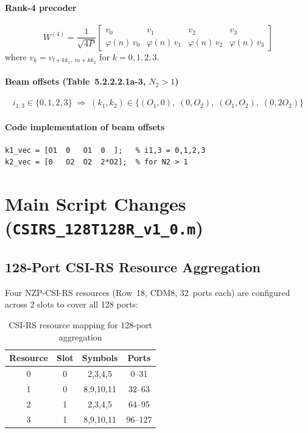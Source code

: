 \documentclass[11pt,a4paper]{article}
\begin{document}
\paragraph{Rank-4 precoder}
\begin{equation}
  W^{(4)} = \frac{1}{\sqrt{4P}}
  \begin{bmatrix}
    v_0 & v_1 & v_2 & v_3 \\
    \varphi(n)\,v_0 & \varphi(n)\,v_1 & \varphi(n)\,v_2 & \varphi(n)\,v_3
  \end{bmatrix}
\end{equation}
where $v_k = v_{l+k k_1,\;m+k k_2}$ for $k=0,1,2,3$.

\paragraph{Beam offsets (Table~5.2.2.2.1a-3, $N_2 > 1$)}
\begin{equation}
  i_{1,3} \in \{0,1,2,3\} \;\Rightarrow\;
  (k_1,k_2) \in \{(O_1,0),\;(0,O_2),\;(O_1,O_2),\;(0,2O_2)\}
\end{equation}

\paragraph{Code implementation of beam offsets}
\begin{lstlisting}
k1_vec = [O1  0   O1  0  ];   % i1,3 = 0,1,2,3
k2_vec = [0   O2  O2  2*O2];  % for N2 > 1
\end{lstlisting}

\section{Main Script Changes (\texttt{CSIRS\_128T128R\_v1\_0.m})}

\subsection{128-Port CSI-RS Resource Aggregation}

Four NZP-CSI-RS resources (Row~18, CDM8, 32~ports each) are configured
across 2 slots to cover all 128 ports:

\begin{table}[h]
\centering
\caption{CSI-RS resource mapping for 128-port aggregation}
\begin{tabular}{cccc}
\toprule
Resource & Slot & Symbols & Ports \\
\midrule
0 & 0 & 2,3,4,5 & 0--31 \\
1 & 0 & 8,9,10,11 & 32--63 \\
2 & 1 & 2,3,4,5 & 64--95 \\
3 & 1 & 8,9,10,11 & 96--127 \\
\bottomrule
\end{tabular}
\end{table}
\end{document}
